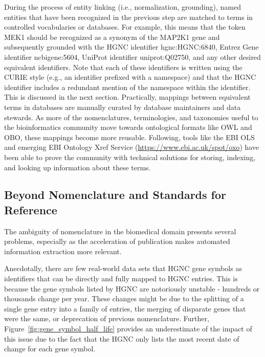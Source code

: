 During the process of entity linking (i.e., normalization, grounding), named entities that have been recognized in the previous step are matched to terms in controlled vocabularies or databases.
For example, this means that the token MEK1 should be recognized as a synonym of the MAP2K1 gene and subsequently grounded with the \ac{HGNC} identifier hgnc:HGNC:6840, Entrez Gene identifier ncbigene:5604, UniProt identifier uniprot:Q02750, and any other desired equivalent identifiers.
Note that each of these identifiers is written using the \ac{CURIE} style (e.g., an identifier prefixed with a namespace) and that the \ac{HGNC} identifier includes a redundant mention of the namespace within the identifier.
This is discussed in the next section.
Practically, mappings between equivalent terms in databases are manually curated by database maintainers and data stewards.
As more of the nomenclatures, terminologies, and taxonomies useful to the bioinformatics community move towards ontological formats like OWL and OBO, these mappings become more reusable.
Following, tools like the \ac{EBI} \ac{OLS}~\cite{Cote2006} and emerging \ac{EBI} Ontology Xref Service (\url{https://www.ebi.ac.uk/spot/oxo}) have been able to prove the community with technical solutions for storing, indexing, and looking up information about these terms.

\subsection{Beyond Nomenclature and Standards for Reference}

The ambiguity of nomenclature in the biomedical domain presents several problems, especially as the acceleration of publication makes automated information extraction more relevant.

Anecdotally, there are few real-world data sets that \ac{HGNC} gene symbols as identifiers that can be directly and fully mapped to \ac{HGNC} entries.
This is because the gene symbols listed by \ac{HGNC} are notoriously unstable - hundreds or thousands change per year.
These changes might be due to the splitting of a single gene entry into a family of entries, the merging of disparate genes that were the same, or deprecation of previous nomenclature.
Further, Figure~\ref{fig:gene_symbol_half_life} provides an underestimate of the impact of this issue due to the fact that the \ac{HGNC} only lists the most recent date of change for each gene symbol.


